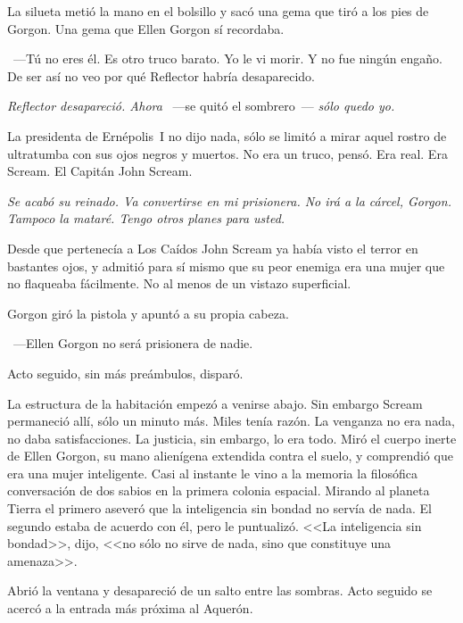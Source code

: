 La silueta metió la mano en el bolsillo y sacó una gema que tiró a los pies de Gorgon. Una gema que Ellen Gorgon sí recordaba.

~---Tú no eres él. Es otro truco barato. Yo le vi morir. Y no fue ningún engaño. De ser así no veo por qué Reflector habría desaparecido.

\emph{Reflector desapareció. Ahora} ~---se quitó el sombrero~--- \emph{sólo quedo yo.}

La presidenta de Ernépolis~I no dijo nada, sólo se limitó a mirar aquel rostro de ultratumba con sus ojos negros y muertos. No era un truco, pensó. Era real. Era Scream. El Capitán John Scream.

\emph{Se acabó su reinado. Va convertirse en mi prisionera. No irá a la cárcel, Gorgon. Tampoco la mataré. Tengo otros planes para usted.}

Desde que pertenecía a Los Caídos John Scream ya había visto el terror en bastantes ojos, y admitió para sí mismo que su peor enemiga era una mujer que no flaqueaba fácilmente. No al menos de un vistazo superficial.

Gorgon giró la pistola y apuntó a su propia cabeza.

~---Ellen Gorgon no será prisionera de nadie.

Acto seguido, sin más preámbulos, disparó.

La estructura de la habitación empezó a venirse abajo. Sin embargo Scream permaneció allí, sólo un minuto más. Miles tenía razón. La venganza no era nada, no daba satisfacciones. La justicia, sin embargo, lo era todo. Miró el cuerpo inerte de Ellen Gorgon, su mano alienígena extendida contra el suelo, y comprendió que era una mujer inteligente. Casi al instante le vino a la memoria la filosófica conversación de dos sabios en la primera colonia espacial. Mirando al planeta Tierra el primero aseveró que la inteligencia sin bondad no servía de nada. El segundo estaba de acuerdo con él, pero le puntualizó. <<La inteligencia sin bondad>>, dijo, <<no sólo no sirve de nada, sino que constituye una amenaza>>.

Abrió la ventana y desapareció de un salto entre las sombras. Acto seguido se acercó a la entrada más próxima al Aquerón.

\endinput
